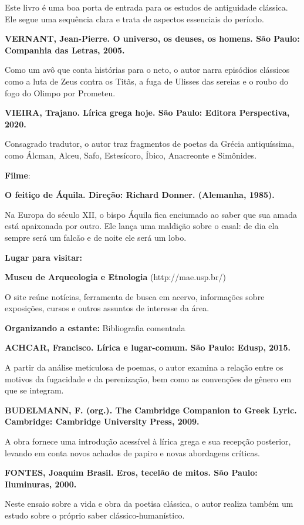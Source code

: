 \documentclass[12pt]{extarticle}
\begin{document}
Este livro é uma boa porta de entrada para os estudos de antiguidade
clássica. Ele segue uma sequência clara e trata de aspectos essenciais
do período.

\textbf{VERNANT, Jean-Pierre. O universo, os deuses, os homens. São
Paulo: Companhia das Letras, 2005.}

Como um avô que conta histórias para o neto, o autor narra episódios
clássicos como a luta de Zeus contra os Titãs, a fuga de Ulisses das
sereias e o roubo do fogo do Olimpo por Prometeu.

\textbf{VIEIRA, Trajano. Lírica grega hoje. São Paulo: Editora
Perspectiva, 2020.}

Consagrado tradutor, o autor traz fragmentos de poetas da Grécia
antiquíssima, como Álcman, Alceu, Safo, Estesícoro, Íbico, Anacreonte e
Simônides.

\textbf{Filme}:

\textbf{O feitiço de Áquila. Direção: Richard Donner. (Alemanha, 1985).}

Na Europa do século XII, o bispo Áquila fica enciumado ao saber que sua
amada está apaixonada por outro. Ele lança uma maldição sobre o casal:
de dia ela sempre será um falcão e de noite ele será um lobo.

\textbf{Lugar para visitar:}

\textbf{Museu de Arqueologia e Etnologia} (http://mae.usp.br/)

O site reúne notícias, ferramenta de busca em acervo, informações sobre
exposições, cursos e outros assuntos de interesse da área.

\textbf{Organizando a estante:} Bibliografia comentada

\textbf{ACHCAR, Francisco. Lírica e lugar-comum. São Paulo: Edusp,
2015.}

A partir da análise meticulosa de poemas, o autor examina a relação
entre os motivos da fugacidade e da perenização, bem como as convenções
de gênero em que se integram.

\textbf{BUDELMANN, F. (org.). The Cambridge Companion to Greek Lyric.
Cambridge: Cambridge University Press, 2009.}

A obra fornece uma introdução acessível à lírica grega e sua recepção
posterior, levando em conta novos achados de papiro e novas abordagens
críticas.

\textbf{FONTES, Joaquim Brasil. Eros, tecelão de mitos. São Paulo:
Iluminuras, 2000.}

Neste ensaio sobre a vida e obra da poetisa clássica, o autor realiza
também um estudo sobre o próprio saber clássico-humanístico.
\end{document}
